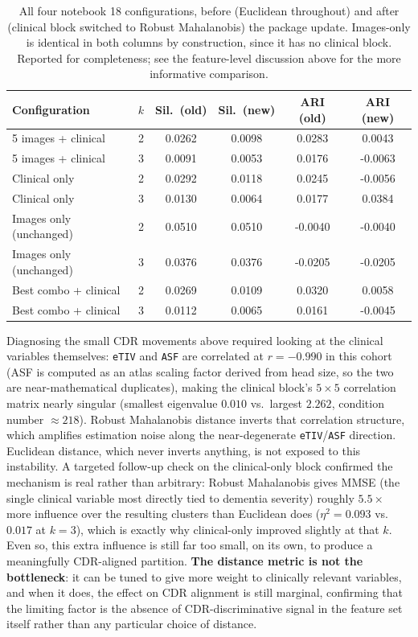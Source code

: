 \documentclass[11pt, a4paper]{article}
\begin{document}
\begin{table}[H]
\centering
\footnotesize
\caption{All four notebook 18 configurations, before (Euclidean throughout) and after (clinical
block switched to Robust Mahalanobis) the package update. Images-only is identical in both columns
by construction, since it has no clinical block. Reported for completeness; see the feature-level
discussion above for the more informative comparison.}
\begin{tabular}{lccccc}
\toprule
\textbf{Configuration} & $k$ & \textbf{Sil.\ (old)} & \textbf{Sil.\ (new)} & \textbf{ARI (old)} & \textbf{ARI (new)} \\
\midrule
5 images + clinical        & 2 & 0.0262 & 0.0098 & 0.0283  & 0.0043 \\
5 images + clinical        & 3 & 0.0091 & 0.0053 & 0.0176  & -0.0063 \\
Clinical only               & 2 & 0.0292 & 0.0118 & 0.0245  & -0.0056 \\
Clinical only               & 3 & 0.0130 & 0.0064 & 0.0177  & 0.0384 \\
Images only (unchanged)     & 2 & 0.0510 & 0.0510 & -0.0040 & -0.0040 \\
Images only (unchanged)     & 3 & 0.0376 & 0.0376 & -0.0205 & -0.0205 \\
Best combo + clinical       & 2 & 0.0269 & 0.0109 & 0.0320  & 0.0058 \\
Best combo + clinical       & 3 & 0.0112 & 0.0065 & 0.0161  & -0.0045 \\
\bottomrule
\end{tabular}
\end{table}

\noindent Diagnosing the small CDR movements above required looking at the clinical variables
themselves: \texttt{eTIV} and
\texttt{ASF} are correlated at $r=-0.990$ in this cohort (ASF is computed as an atlas scaling factor
derived from head size, so the two are near-mathematical duplicates), making the clinical block's
$5\times5$ correlation matrix nearly singular (smallest eigenvalue $0.010$ vs.\ largest $2.262$,
condition number $\approx 218$). Robust Mahalanobis distance inverts that correlation structure,
which amplifies estimation noise along the near-degenerate \texttt{eTIV}/\texttt{ASF} direction.
Euclidean distance, which never inverts anything, is not exposed to this instability. A targeted
follow-up check on the clinical-only block confirmed the mechanism is real rather than arbitrary:
Robust Mahalanobis gives MMSE (the single clinical variable most directly tied to dementia severity)
roughly $5.5\times$ more influence over the resulting clusters than Euclidean does ($\eta^2=0.093$
vs.\ $0.017$ at $k=3$), which is exactly why clinical-only improved slightly at that $k$. Even so,
this extra influence is still far too small, on its own, to produce a meaningfully CDR-aligned
partition.
\textbf{The distance metric is not the bottleneck}: it can be tuned to give more weight to
clinically relevant variables, and when it does, the effect on CDR alignment is still marginal,
confirming that the limiting factor is the absence of CDR-discriminative signal in the feature set
itself rather than any particular choice of distance.
\end{document}
